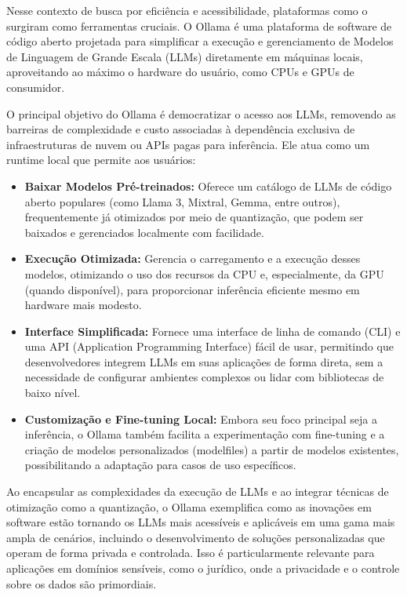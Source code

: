 Nesse contexto de busca por eficiência e acessibilidade, plataformas como o  surgiram como ferramentas cruciais. O Ollama é uma plataforma de software de código aberto projetada para simplificar a execução e gerenciamento de Modelos de Linguagem de Grande Escala (LLMs) diretamente em máquinas locais, aproveitando ao máximo o hardware do usuário, como CPUs e GPUs de consumidor.



O principal objetivo do Ollama é democratizar o acesso aos LLMs, removendo as barreiras de complexidade e custo associadas à dependência exclusiva de infraestruturas de nuvem ou APIs pagas para inferência. Ele atua como um runtime local que permite aos usuários:



\begin{itemize}

\item \textbf{Baixar Modelos Pré-treinados:} Oferece um catálogo de LLMs de código aberto populares (como Llama 3, Mixtral, Gemma, entre outros), frequentemente já otimizados por meio de quantização, que podem ser baixados e gerenciados localmente com facilidade.

\item \textbf{Execução Otimizada:} Gerencia o carregamento e a execução desses modelos, otimizando o uso dos recursos da CPU e, especialmente, da GPU (quando disponível), para proporcionar inferência eficiente mesmo em hardware mais modesto.

\item \textbf{Interface Simplificada:} Fornece uma interface de linha de comando (CLI) e uma API (Application Programming Interface) fácil de usar, permitindo que desenvolvedores integrem LLMs em suas aplicações de forma direta, sem a necessidade de configurar ambientes complexos ou lidar com bibliotecas de baixo nível.

\item \textbf{Customização e Fine-tuning Local:} Embora seu foco principal seja a inferência, o Ollama também facilita a experimentação com fine-tuning e a criação de modelos personalizados (modelfiles) a partir de modelos existentes, possibilitando a adaptação para casos de uso específicos.

\end{itemize}



Ao encapsular as complexidades da execução de LLMs e ao integrar técnicas de otimização como a quantização, o Ollama exemplifica como as inovações em software estão tornando os LLMs mais acessíveis e aplicáveis em uma gama mais ampla de cenários, incluindo o desenvolvimento de soluções personalizadas que operam de forma privada e controlada. Isso é particularmente relevante para aplicações em domínios sensíveis, como o jurídico, onde a privacidade e o controle sobre os dados são primordiais.